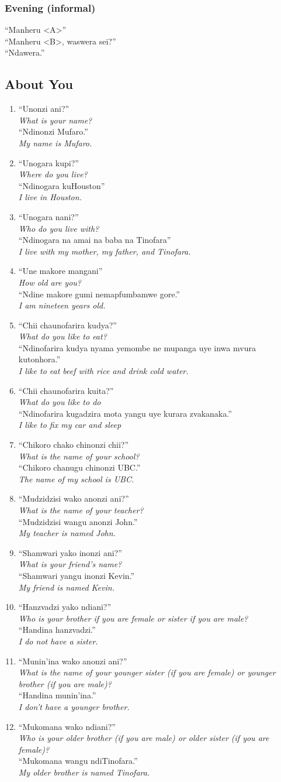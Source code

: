 \documentclass[12pt]{article}
\newcommand{\tl}[2]{``#1''\\\textit{#2}}
\newcommand{\resp}[4]{%
  \tl{#1}{#2} \\
  \tl{#3}{#4}
}
\begin{document}
\subsubsection{Evening (informal)}
\tl{Manheru <A>}{}
\tl{Manheru <B>, waswera sei?}{}
\tl{Ndawera.}{}

\subsection{About You}
\begin{enumerate}
\item \resp{Unonzi ani?}{What is your name?}{Ndinonzi Mufaro.}{My name is Mufaro.}
\item \resp{Unogara kupi?}{Where do you live?}{Ndinogara kuHouston}{I live in Houston.}
\item \resp{Unogara nani?}{Who do you live with?}{Ndinogara na amai na baba na Tinofara}{I live with my mother, my father, and Tinofara.}
\item \resp{Une makore mangani}{How old are you?}{Ndine makore gumi nemapfumbamwe gore.}{I am nineteen years old.}
\item \resp{Chii chaunofarira kudya?}{What do you like to eat?}{Ndinofarira kudya nyama yemombe ne mupanga uye inwa mvura kutonhora.}{I like to eat beef with rice and drink cold water.}
\item \resp{Chii chaunofarira kuita?}{What do you like to do}{Ndinofarira kugadzira mota yangu uye kurara zvakanaka.}{I like to fix my car and sleep}
\item \resp{Chikoro chako chinonzi chii?}{What is the name of your school?}{Chikoro chanugu chinonzi UBC.}{The name of my school is UBC.}
\item \resp{Mudzidzisi wako anonzi ani?}{What is the name of your teacher?}{Mudzidzisi wangu anonzi John.}{My teacher is named John.}
\item \resp{Shamwari yako inonzi ani?}{What is your friend's name?}{Shamwari yangu inonzi Kevin.}{My friend is named Kevin.}
\item \resp{Hanzvadzi yako ndiani?}{Who is your brother if you are female or sister if you are male?}{Handina hanzvadzi.}{I do not have a sister.}
\item \resp{Munin'ina wako anonzi ani?}{What is the name of your younger sister (if you are female) or younger brother (if you are male)?}{Handina munin'ina.}{I don't have a younger brother.}
\item \resp{Mukomana wako ndiani?}{Who is your older brother (if you are male) or older sister (if you are female)?}{Mukomana wangu ndiTinofara.}{My older brother is named Tinofara.}

\end{enumerate}
\end{document}
